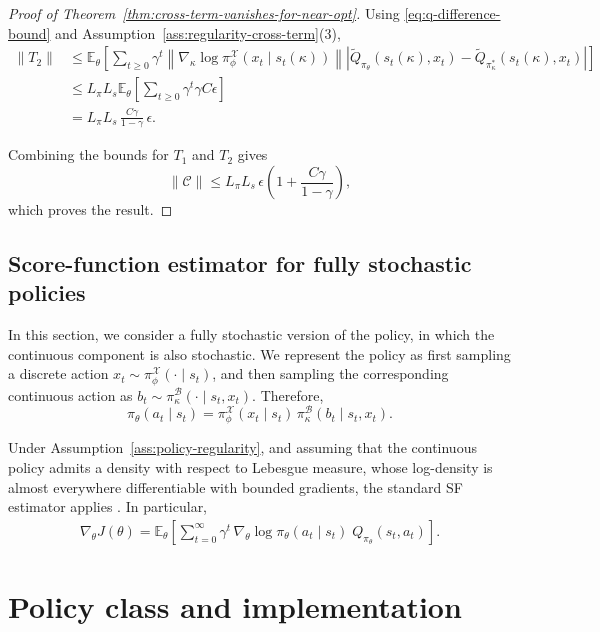 \documentclass{article}
\theoremstyle{definition}
\theoremstyle{remark}
\begin{document}
\begin{proof}[Proof of Theorem~\ref{thm:cross-term-vanishes-for-near-opt}]
Using \eqref{eq:q-difference-bound} and Assumption~\ref{ass:regularity-cross-term}(3),
\begin{align*}
\|T_2\|
&\leq
\mathbb{E}_{\theta}\!\left[
\sum_{t\geq 0}\gamma^t
\left\|
\nabla_{\kappa}\log \pi^{\mathcal X}_{\phi}
(x_t\mid s_t(\kappa))
\right\|
\left|
\tilde Q_{\pi_\theta}(s_t(\kappa),x_t)
-
\tilde Q_{\pi^*_\kappa}(s_t(\kappa),x_t)
\right|
\right] \\
&\leq
L_\pi L_s
\mathbb{E}_{\theta}\!\left[
\sum_{t\geq 0}\gamma^t
\gamma C\epsilon
\right] \\
&=
L_\pi L_s\,
\frac{C\gamma}{1-\gamma}\,
\epsilon.
\end{align*}

Combining the bounds for $T_1$ and $T_2$ gives
\[
\|\mathcal C\|
\leq
L_\pi L_s\,\epsilon
\left(
1+\frac{C\gamma}{1-\gamma}
\right),
\]
which proves the result.
\end{proof}

\subsection{Score-function estimator for fully stochastic policies}
\label{appendix:sf-estimator}

In this section, we consider a fully stochastic version of the policy, in which
the continuous component is also stochastic. We
represent the policy as first sampling a discrete action
$x_t \sim \pi^{\mathcal X}_{\phi}(\cdot \mid s_t)$, and then sampling
the corresponding continuous action as
$b_t \sim \pi^{\mathcal B}_{\kappa}(\cdot \mid s_t, x_t)$.
Therefore,
\[
\pi_{\theta}(a_t \mid s_t)
=
\pi^{\mathcal X}_{\phi}(x_t \mid s_t)\,
\pi^{\mathcal B}_{\kappa}(b_t \mid s_t, x_t).
\]

Under Assumption~\ref{ass:policy-regularity}, and assuming that the continuous
policy admits a density with respect to Lebesgue measure, whose log-density is
almost everywhere differentiable with bounded gradients, the standard
SF estimator applies \citep{sutton1999policy}. In particular,
\begin{align}
\label{eq:sf-gradient}
\nabla_\theta J(\theta)
=
\mathbb{E}_{\theta}\!\left[
\sum_{t=0}^{\infty}
\gamma^{t}\,
\nabla_{\theta}\log \pi_{\theta}(a_t \mid s_t)\;
Q_{\pi_{\theta}}(s_t,a_t)
\right].
\end{align}

\section{Policy class and implementation}
\label{appendix:policy-and-implementation}
\end{document}
